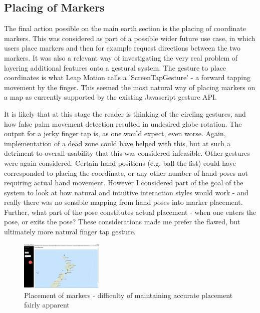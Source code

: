 \documentclass{sigplanconf}
\begin{document}
\subsection{Placing of Markers}

The final action possible on the main earth section is the placing of coordinate markers. This was considered as part of a possible wider future use case, in which users place markers and then for example request directions between the two markers. It was also a relevant way of investigating the very real problem of layering additional features onto a gestural system. The gesture to place coordinates is what Leap Motion calls a 'ScreenTapGesture' - a forward tapping movement by the finger. This seemed the most natural way of placing markers on a map as currently supported by the existing Javascript gesture API. 

It is likely that at this stage the reader is thinking of the circling gestures, and how false palm movement detection resulted in undesired globe rotation. The output for a jerky finger tap is, as one would expect, even worse. Again, implementation of a dead zone could have helped with this, but at such a detriment to overall usability that this was considered infeasible. Other gestures were again considered. Certain hand positions (e.g. ball the fist) could have corresponded to placing the coordinate, or any other number of hand poses not requiring actual hand movement. However I considered part of the goal of the system to look at how natural and intuitive interaction styles would work - and really there was no sensible mapping from hand poses into marker placement. Further, what part of the pose constitutes actual placement - when one enters the pose, or exits the pose? These considerations made me prefer the flawed, but ultimately more natural finger tap gesture.

\begin{center}
\begin{figure}[h!]
\centering
\includegraphics[width=150px]{images/marker_placement.png}
\caption{Placement of markers - difficulty of maintaining accurate placement fairly apparent}
\label{fig:halo_comparison}
\vspace{-10pt}
\end{figure}
\end{center}
\end{document}
